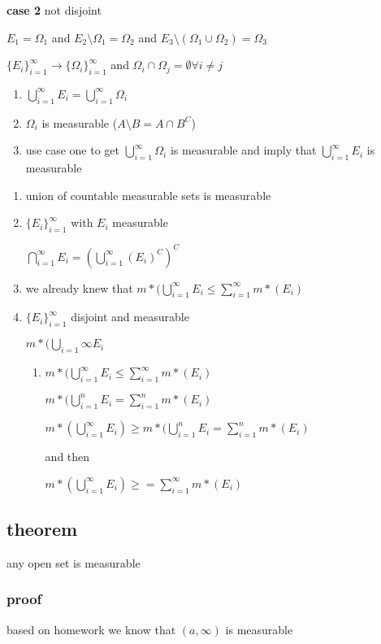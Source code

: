 \documentclass[letterpaper]{article}
\begin{document}
{\bfseries case 2} not disjoint

$E_1=\Omega_1$ and $E_2\setminus\Omega_1=\Omega_2$ and $E_3\setminus(\Omega_1\cup\Omega_2)=\Omega_3$

$\{E_i\}_{i=1}^\infty\to \{\Omega_i\}_{i=1}^\infty$ and $\Omega_i\cap\Omega_j=\emptyset\forall i\ne j$
\begin{enumerate}
\item
$\bigcup\limits_{i=1}^\infty E_i=\bigcup\limits_{i=1}^\infty \Omega_i$
\item
$\Omega_i$ is measurable ($A\setminus B=A\cap B^C$)
\item
use case one to get 
$\bigcup\limits_{i=1}^\infty \Omega_i$ is measurable and imply that
$\bigcup\limits_{i=1}^\infty E_i$ is measurable
\end{enumerate}


\begin{enumerate}
\item
union of countable measurable sets is measurable
\item
$\{E_i\}_{i=1}^\infty$ with $E_i$ measurable

$\bigcap_{i=1}^\infty E_i=\left(\bigcup\limits_{i=1}^\infty(E_i)^C\right)^C$
\item
we already knew that $m*(\bigcup\limits_{i=1}^\infty E_i\le \sum\limits_{i=1}^\infty{m*(E_i)}$
\item
$\{E_i\}_{i=1}^\infty$ disjoint and measurable

$m*(\bigcup_{i=1}\infty E_i$

\begin{enumerate}
\item
$m*(\bigcup\limits_{i=1}^\infty E_i\le \sum\limits_{i=1}^\infty{m*(E_i)}$

$m*(\bigcup\limits_{i=1}^n E_i= \sum\limits_{i=1}^n{m*(E_i)}$

$m*(\bigcup_{i=1}^\infty E_i)\ge m*(\bigcup\limits_{i=1}^n E_i= \sum\limits_{i=1}^n{m*(E_i)}$

and then

$m*(\bigcup_{i=1}^\infty E_i)\ge = \sum\limits_{i=1}^\infty{m*(E_i)}$

\end{enumerate}
\end{enumerate}

\subsection*{theorem}
any open set is measurable
\subsubsection*{proof}
based on homework we know that $(a,\infty)$ is measurable
\end{document}
